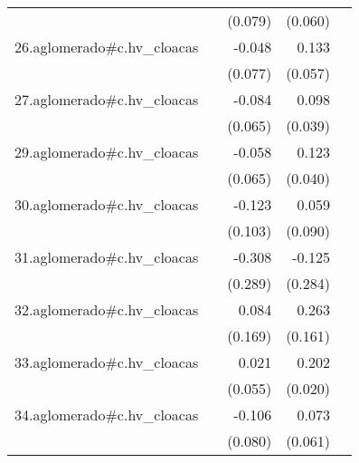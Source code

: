 {\begin{longtable}{l*{4}{D{.}{.}{-1}}}
            &                     &     (0.079)         &     (0.060)         &                     \\
\addlinespace
26.aglomerado#c.hv\_cloacas&                     &      -0.048         &       0.133\sym{*}  &                     \\
            &                     &     (0.077)         &     (0.057)         &                     \\
\addlinespace
27.aglomerado#c.hv\_cloacas&                     &      -0.084         &       0.098\sym{*}  &                     \\
            &                     &     (0.065)         &     (0.039)         &                     \\
\addlinespace
29.aglomerado#c.hv\_cloacas&                     &      -0.058         &       0.123\sym{**} &                     \\
            &                     &     (0.065)         &     (0.040)         &                     \\
\addlinespace
30.aglomerado#c.hv\_cloacas&                     &      -0.123         &       0.059         &                     \\
            &                     &     (0.103)         &     (0.090)         &                     \\
\addlinespace
31.aglomerado#c.hv\_cloacas&                     &      -0.308         &      -0.125         &                     \\
            &                     &     (0.289)         &     (0.284)         &                     \\
\addlinespace
32.aglomerado#c.hv\_cloacas&                     &       0.084         &       0.263         &                     \\
            &                     &     (0.169)         &     (0.161)         &                     \\
\addlinespace
33.aglomerado#c.hv\_cloacas&                     &       0.021         &       0.202\sym{***}&                     \\
            &                     &     (0.055)         &     (0.020)         &                     \\
\addlinespace
34.aglomerado#c.hv\_cloacas&                     &      -0.106         &       0.073         &                     \\
            &                     &     (0.080)         &     (0.061)         &                     \\

\end{longtable}}
